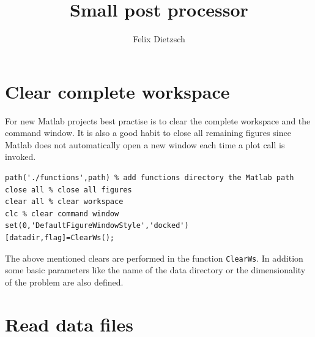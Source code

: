 \documentclass[preprint,12pt,ntfdMod]{elsarticle}
\author[rss]{Felix Dietzsch}
\title{Small post processor}
\begin{document}
		\maketitle 
		\tableofcontents

\section{Clear complete workspace}

\begin{par}
For new Matlab projects best practise is to clear the complete workspace and the command window. It is also a good habit to close all remaining figures since Matlab does not automatically open a new window each time a plot call is invoked.
\end{par} \vspace{1em}
\begin{verbatim}
path('./functions',path) % add functions directory the Matlab path
close all % close all figures
clear all % clear workspace
clc % clear command window
set(0,'DefaultFigureWindowStyle','docked')
[datadir,flag]=ClearWs();
\end{verbatim}
\begin{par}

The above mentioned clears are performed in the function \verb|ClearWs|.
In addition some basic parameters like the name of the data
directory or the dimensionality of the problem are also defined.


\end{par} \vspace{1em}


\section{Read data files}
\end{document}
